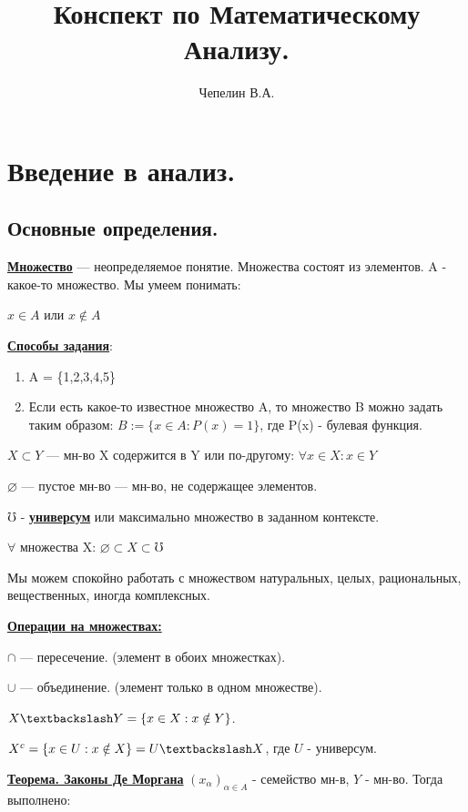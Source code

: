 \documentclass{article}
\title{Конспект по Математическому Анализу.}
\author{Чепелин В.А.}
\date{ }
\newcommand{\deff}[1]{\underline{\textbf{#1}}}
\newcommand{\thmm}[1]{\underline{\textbf{#1}}}
\begin{document}
\maketitle
\tableofcontents
\pagebreak



\section{Введение в анализ.}
\subsection{Основные определения.}

\deff{Множество} — неопределяемое понятие. Множества состоят из элементов.
A - какое-то множество. Мы умеем понимать:

$x \in A$ или $x \notin A$

\deff{Способы задания}: 
\begin{enumerate} 
\item  A = \{1,2,3,4,5\}

\item Если есть какое-то известное множество A, то  множество B можно задать таким образом:
$B:=\{x \in A: P(x) = 1\}$, где P(x) - булевая функция. 
\end{enumerate} 



$X \subset Y$ --- мн-во X содержится в Y или по-другому: $\forall x \in X: x \in Y$

$\varnothing$ --- пустое мн-во --- мн-во, не содержащее элементов.

$\mho$ - \deff{универсум} или максимально множество в заданном контексте.

$\forall$ множества X: $\varnothing \subset X \subset \mho$

Мы можем спокойно работать с множеством натуральных, целых, рациональных, вещественных, иногда комплексных.

\deff{Операции на множествах:}

$\cap$ --- пересечение. (элемент в обоих множестках).

$\cup$ --- объединение. (элемент только в одном множестве).

$X \textbackslash Y = \{x \in X: x \notin Y\}$.

$X^c = \{x \in U: x \notin X\} = U \textbackslash X$, где $U$ - универсум.

\thmm{Теорема. Законы Де Моргана}
$(x_\alpha)_{\alpha \in A}$ - семейство мн-в, $Y$ - мн-во. Тогда выполнено:
\end{document}
